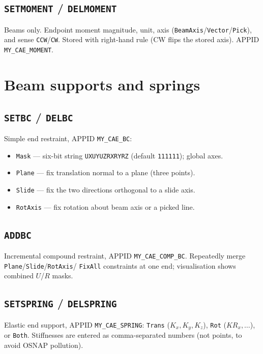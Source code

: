 \documentclass[a4paper]{ltxdoc}
\newcommand{\cadcmd}[1]{\texttt{\textbf{#1}}}
\newcommand{\appid}[1]{\texttt{#1}}
\begin{document}
\subsection{\cadcmd{SETMOMENT} / \cadcmd{DELMOMENT}}
Beams only.  Endpoint moment magnitude, unit, axis
(\texttt{BeamAxis}/\texttt{Vector}/\texttt{Pick}), and sense
\texttt{CCW}/\texttt{CW}.  Stored with right-hand rule (CW flips the
stored axis).  APPID \appid{MY\_CAE\_MOMENT}.

\section{Beam supports and springs}

\subsection{\cadcmd{SETBC} / \cadcmd{DELBC}}
Simple end restraint, APPID \appid{MY\_CAE\_BC}:
\begin{itemize}[nosep]
  \item \texttt{Mask} --- six-bit string \texttt{UXUYUZRXRYRZ}
        (default \texttt{111111}); global axes.
  \item \texttt{Plane} --- fix translation normal to a plane (three points).
  \item \texttt{Slide} --- fix the two directions orthogonal to a slide axis.
  \item \texttt{RotAxis} --- fix rotation about beam axis or a picked line.
\end{itemize}

\subsection{\cadcmd{ADDBC}}
Incremental compound restraint, APPID \appid{MY\_CAE\_COMP\_BC}.
Repeatedly merge \texttt{Plane}/\texttt{Slide}/\texttt{RotAxis}/
\texttt{FixAll} constraints at one end; visualisation shows combined
$U$/$R$ masks.

\subsection{\cadcmd{SETSPRING} / \cadcmd{DELSPRING}}
Elastic end support, APPID \appid{MY\_CAE\_SPRING}:
\texttt{Trans} ($K_x,K_y,K_z$), \texttt{Rot} ($KR_x,\ldots$), or
\texttt{Both}.  Stiffnesses are entered as comma-separated numbers (not
points, to avoid OSNAP pollution).
\end{document}
